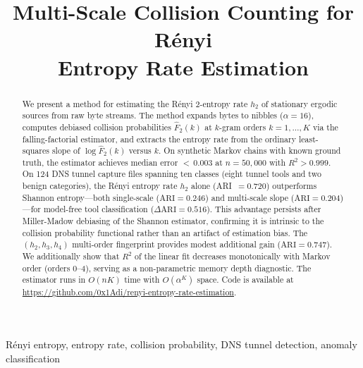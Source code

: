\documentclass[conference]{IEEEtran}
\begin{document}
\title{Multi-Scale Collision Counting for R\'enyi\\ Entropy Rate Estimation}

\author{
}

\maketitle

\begin{abstract}
We present a method for estimating the R\'enyi 2-entropy rate $h_2$ of stationary ergodic sources from raw byte streams. The method expands bytes to nibbles ($\alpha=16$), computes debiased collision probabilities $\hat{F}_2(k)$ at $k$-gram orders $k=1,\ldots,K$ via the falling-factorial estimator, and extracts the entropy rate from the ordinary least-squares slope of $\log \hat{F}_2(k)$ versus $k$. On synthetic Markov chains with known ground truth, the estimator achieves median error ${<}\,0.003$ at $n=50{,}000$ with $R^2 > 0.999$. On 124 DNS tunnel capture files spanning ten classes (eight tunnel tools and two benign categories), the R\'enyi entropy rate $h_2$ alone (ARI~$=0.720$) outperforms Shannon entropy---both single-scale ($\mathrm{ARI}=0.246$) and multi-scale slope ($\mathrm{ARI}=0.204$)---for model-free tool classification ($\Delta\mathrm{ARI} = 0.516$). This advantage persists after Miller-Madow debiasing of the Shannon estimator, confirming it is intrinsic to the collision probability functional rather than an artifact of estimation bias. The $(h_2, h_3, h_4)$ multi-order fingerprint provides modest additional gain ($\mathrm{ARI}=0.747$). We additionally show that $R^2$ of the linear fit decreases monotonically with Markov order (orders 0--4), serving as a non-parametric memory depth diagnostic. The estimator runs in $O(nK)$ time with $O(\alpha^K)$ space. Code is available at \url{https://github.com/0x1Adi/renyi-entropy-rate-estimation}.
\end{abstract}

\begin{IEEEkeywords}
R\'enyi entropy, entropy rate, collision probability, DNS tunnel detection, anomaly classification
\end{IEEEkeywords}

\end{document}
